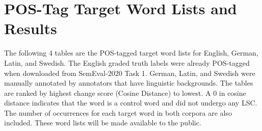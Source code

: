 \section{POS-Tag Target Word Lists and Results}
\label{app-postags}


The following 4 tables are the POS-tagged target word lists for English, German, Latin, and Swedish. The English graded truth labels were already POS-tagged when downloaded from SemEval-2020 Task 1. German, Latin, and Swedish were manually annotated by annotators that have linguistic backgrounds. The tables are ranked by highest change score (Cosine Distance) to lowest. A 0 in cosine distance indicates that the word is a control word and did not undergo any LSC. The number of occurrences for each target word in both corpora are also included. These word lists will be made available to the public.



